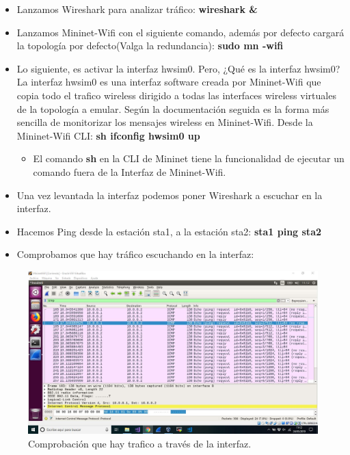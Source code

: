 \begin{itemize}
    \item Lanzamos Wireshark para analizar tráfico: \textbf{wireshark \&}
    \item Lanzamos Mininet-Wifi con el siguiente comando, además por defecto cargará la topología por defecto(Valga la redundancia): \textbf{sudo mn -wifi}
    \item Lo siguiente, es activar la interfaz hwsim0. Pero, ¿Qué es la interfaz hwsim0? La interfaz hwsim0 es una interfaz software creada por Mininet-Wifi que copia todo el trafico wireless  dirigido a todas las interfaces wireless virtuales de la topología a emular. Según la documentación seguida es la forma más sencilla de monitorizar los mensajes wireless en Mininet-Wifi. Desde la Mininet-Wifi CLI: \textbf{sh ifconfig hwsim0 up} 
    \begin{itemize}
        \item El comando \textbf{sh} en la CLI de Mininet tiene la funcionalidad de ejecutar un comando fuera de la Interfaz de Mininet-Wifi.
    \end{itemize}
    
    \item Una vez levantada la interfaz podemos poner Wireshark a escuchar en la interfaz.
    
    \item Hacemos Ping desde la estación sta1, a la estación sta2: \textbf{sta1 ping sta2}
    
    \item Comprobamos que hay tráfico escuchando en la interfaz:
    
    
\end{itemize}
\newpage
\begin{figure}[!htb]
  \centering
    \includegraphics[width=\linewidth]{./img/5.JPG}
    \caption{Comprobación que hay trafico a través de la interfaz.}
  \label{fig:yo}
\end{figure}

